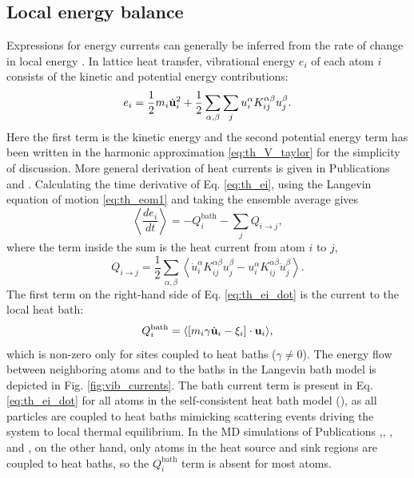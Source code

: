 \subsection{Local energy balance}
\label{sec:th_energybalance}
Expressions for energy currents can generally be inferred from the rate of change in local energy \cite{hardy63}. In lattice heat transfer, vibrational energy $e_i$ of each atom $i$ consists of the kinetic and potential energy contributions:
\begin{equation}
 e_i = \frac{1}{2}m_i\dot{\mathbf{u}}_i^2 + \frac{1}{2} \sum_{\alpha,\beta}\sum_j u_i^{\alpha} K_{ij}^{\alpha\beta} u_j^{\beta} . \label{eq:th_ei}
\end{equation}
Here the first term is the kinetic energy and the second potential energy term has been written in the harmonic approximation \eqref{eq:th_V_taylor} for the simplicity of discussion. More general derivation of heat currents is given in Publications  and . Calculating the time derivative of Eq. \eqref{eq:th_ei}, using the Langevin equation of motion \eqref{eq:th_eom1} and taking the ensemble average gives
\begin{equation}
 \left\langle \frac{de_i}{dt} \right\rangle =  -  Q_i^{\textrm{bath}} -\sum_j  Q_{i\to j}, \label{eq:th_ei_dot}
\end{equation}
where the term inside the sum is the heat current from atom $i$ to $j$,
\begin{equation}
 Q_{i \to j} = \frac{1}{2} \sum_{\alpha,\beta} \left\langle \dot{u}_i^{\alpha}K_{ij}^{\alpha\beta} u_j^{\beta} - u_i^{\alpha} K_{ij}^{\alpha\beta} \dot{u}_j^{\beta} \right\rangle. \label{eq:th_Qij}
\end{equation}
The first term on the right-hand side of Eq. \eqref{eq:th_ei_dot} is the current to the local heat bath:
\begin{equation}
 Q_i^{\textrm{bath}} = \langle [m_i\gamma \dot{\mathbf{u}}_i-\xi_i] \cdot \mathbf{u}_i \rangle, \label{eq:th_Qibath}
\end{equation}
which is non-zero only for sites coupled to heat baths ($\gamma\neq 0$). The energy flow between neighboring atoms and to the baths in the Langevin bath model is depicted in Fig. \ref{fig:vib_currents}. The bath current term is present in Eq. \eqref{eq:th_ei_dot} for all atoms in the self-consistent heat bath model (), as all particles are coupled to heat baths mimicking scattering events driving the system to local thermal equilibrium. In the MD simulations of Publications ,, , and , on the other hand, only atoms in the heat source and sink regions are coupled to heat baths, so the $Q_i^{\textrm{bath}}$ term is absent for most atoms. 

